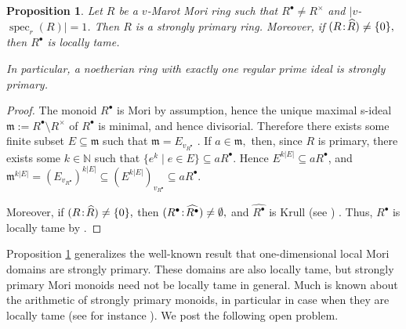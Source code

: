 \documentclass[a4paper, 10pt]{amsart}
\theoremstyle{plain}
\newtheorem{proposition}[theorem]{Proposition}
\theoremstyle{definition}
\theoremstyle{remark}
\newcommand{\N}{\mathbb N}
\DeclareMathOperator{\spec}{spec}
\newcommand{\DP}{\negthinspace : \negthinspace}
\numberwithin{equation}{section}
\begin{document}
\begin{proposition}\label{lemma:stronglyprimary1}
    Let $R$ be a $v$-Marot Mori ring such that $R^\bullet\ne R^\times$ and $|v$-$\spec_r(R)|=1$. Then $R$ is a strongly primary ring. Moreover, if $(R\DP \widehat{R})\ne \{0\},$ then $R^\bullet$ is locally tame. 
    
    In particular, a noetherian ring with exactly one regular prime ideal is strongly primary.
\end{proposition}
\begin{proof}
    The monoid $R^\bullet$ is Mori by assumption, hence the unique maximal s-ideal $\mathfrak{m}:=R^\bullet\setminus R^\times$ of $R^\bullet$ is minimal, and hence divisorial. Therefore there exists some finite subset $E\subseteq \mathfrak{m}$ such that $\mathfrak{m}=E_{v_{R^\bullet}}$ \cite[Proposition 2.1.10]{GHK06}. If $a\in \mathfrak{m},$ then, since $R$ is primary, there exists some $k\in \N$ such that $\{e^k\mid e\in E\} \subseteq aR^\bullet$. Hence $E^{k|E|}\subseteq aR^\bullet$, and $\mathfrak{m}^{k|E|}=(E_{v_{R^\bullet}})^{k|E|}\subseteq (E^{k|E|})_{v_{R^\bullet}}\subseteq aR^\bullet.$ 

     Moreover, if $(R\DP \widehat{R})\ne \{0\},$ then $(R^\bullet\DP \widehat{R^\bullet})\ne \emptyset,$ and $\widehat{R^\bullet}$ is Krull (see \cite[Theorem 2.3.5]{GHK06}) . Thus, $R^\bullet$ is locally tame by \cite[Theorem 3.5]{GHL07}.
\end{proof}
Proposition \ref{lemma:stronglyprimary1} generalizes the well-known result that one-dimensional local Mori domains are strongly primary. These domains are also locally tame, but strongly primary Mori monoids need not be locally tame in general. Much is known about the arithmetic of strongly primary monoids, in particular in case when they are locally tame (see for instance \cite[Theorem 4.1]{GGT21}). We post the following open problem.
\end{document}
